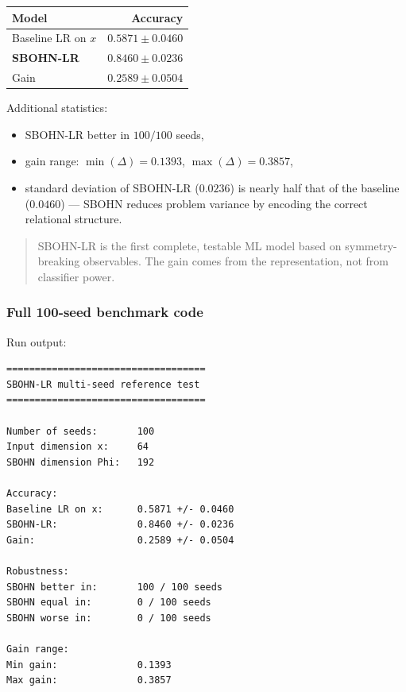 \documentclass[11pt,a4paper]{report}
\begin{document}
\begin{center}
\begin{tabular}{lr}
\toprule
Model & Accuracy \\
\midrule
Baseline LR on $x$ & $0.5871\pm0.0460$ \\
\textbf{SBOHN-LR} & $\mathbf{0.8460\pm0.0236}$ \\
Gain & $0.2589\pm0.0504$ \\
\bottomrule
\end{tabular}
\end{center}

Additional statistics:
\begin{itemize}
\item SBOHN-LR better in $100/100$ seeds,
\item gain range: $\min(\Delta)=0.1393$, $\max(\Delta)=0.3857$,
\item standard deviation of SBOHN-LR ($0.0236$) is nearly half
that of the baseline ($0.0460$) --- SBOHN reduces problem variance by encoding
the correct relational structure.
\end{itemize}

\begin{quote}
SBOHN-LR is the first complete, testable ML model based on symmetry-breaking observables. The gain comes from the representation, not from classifier power.
\end{quote}

\subsubsection{Full 100-seed benchmark code}

\noindent{}


Run output:

\begin{verbatim}
===================================
SBOHN-LR multi-seed reference test
===================================

Number of seeds:       100
Input dimension x:     64
SBOHN dimension Phi:   192

Accuracy:
Baseline LR on x:      0.5871 +/- 0.0460
SBOHN-LR:              0.8460 +/- 0.0236
Gain:                  0.2589 +/- 0.0504

Robustness:
SBOHN better in:       100 / 100 seeds
SBOHN equal in:        0 / 100 seeds
SBOHN worse in:        0 / 100 seeds

Gain range:
Min gain:              0.1393
Max gain:              0.3857
\end{verbatim}
\end{document}
